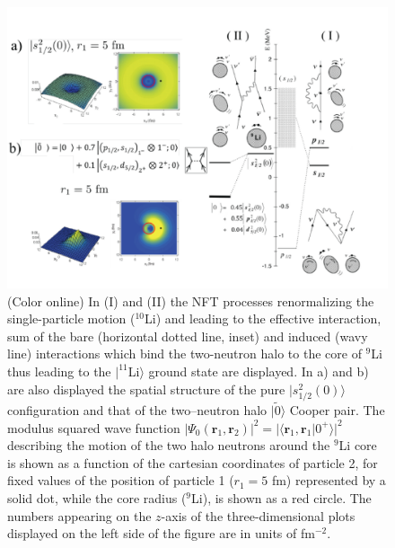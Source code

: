   \begin{figure}
  \centerline{\includegraphics*[width=\textwidth,angle=0]{nutshell/figs/fig1F3.pdf}}
  \caption{(Color online) In (I) and (II) the NFT processes renormalizing the single-particle motion ($^{10}$Li) and leading to the effective interaction, sum of the bare (horizontal dotted line, inset) and induced (wavy line) interactions which bind the two-neutron halo to the core of $^{9}$Li  thus leading to the $|^{11}$Li$\rangle$ ground state are displayed. In a) and b) are also displayed the  spatial structure of the pure $|s_{1/2}^2(0)\rangle$ configuration and that of the two--neutron halo $|\tilde 0\rangle$ Cooper pair. The modulus squared wave function $|\Psi_0(\mathbf{r}_1,\mathbf{r}_2)|^2=|\langle \mathbf{r}_1,\mathbf{r}_1|0^+\rangle|^2$ describing the motion of the two halo neutrons around the $^9$Li core 
  is shown as a function of the cartesian coordinates of particle 2, for fixed values of the
  position of particle 1 ($r_1 = 5$ fm) represented  by a solid dot, while the core radius ($^9$Li), is shown as a red
  circle. The numbers appearing on the $z$-axis of the three-dimensional plots displayed on the left side of the figure are in units of fm$^{-2}$.}\label{fig1F3}
  \end{figure}

